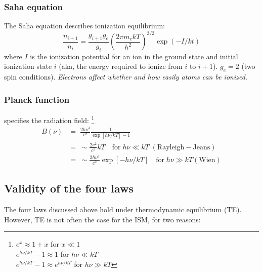 \documentclass[12pt]{article}
\newcommand{\mar}[1]{\hspace{0pt}\marginpar{-\textcolor{black}{#1}-}}
\newcommand{\mynotes}[1]{{\fontfamily{cmss}\selectfont \textit{#1}}}
\begin{document}
\subsubsection{Saha equation}
The Saha equation describes ionization equilibrium:
\[
    \frac{n_{i+1}}{n_{i}} = \frac{g_{i+1}g_{e}}{g_{i}}
    \left( \frac{2\pi m_{e}kT}{h^{2}} \right) ^{3/2}
    \exp \left( -I/kt \right)
    \]
where $I$ is the ionization potential for an ion in the ground state
and initial ionization state $i$ (aka, the energy required to ionize
from $i$ to $i+1$). $g_{e} = 2$ (two spin conditions).
\mynotes{Electrons affect whether and how easily atoms can be ionized.}

\subsubsection{Planck function} specifies the radiation field:
\footnote{
    $e^{x} \approx 1 + x$ for $x \ll 1$\\
    $e^{h\nu/kT}-1 \approx 1$ for $h\nu \ll kT$\\
    $e^{h\nu/kT}-1 \approx e^{h\nu/kT}$ for $h\nu \gg kT$}
\begin{align*}
    B(\nu) &= \;\frac{2h\nu^{3}}{c^{2}}\frac{1}{\exp[h\nu/kT]-1}\\
    &= \;\sim \frac{2\nu^{2}}{c^{2}}kT\quad \mathrm{for}\;h\nu \ll kT\;
    (\mathrm{Rayleigh-Jeans})\\
    &= \;\sim \frac{2h\nu^{3}}{c^{2}}\exp[-h\nu/kT]\quad\mathrm{for}\;h\nu \gg kT
    (\mathrm{Wien})
\end{align*}

\subsection{Validity of the four laws}
\mar{19}The four laws discussed above hold under thermodynamic equilibrium
(TE). However, TE is not often the case for the ISM, for two reasons:
\end{document}
